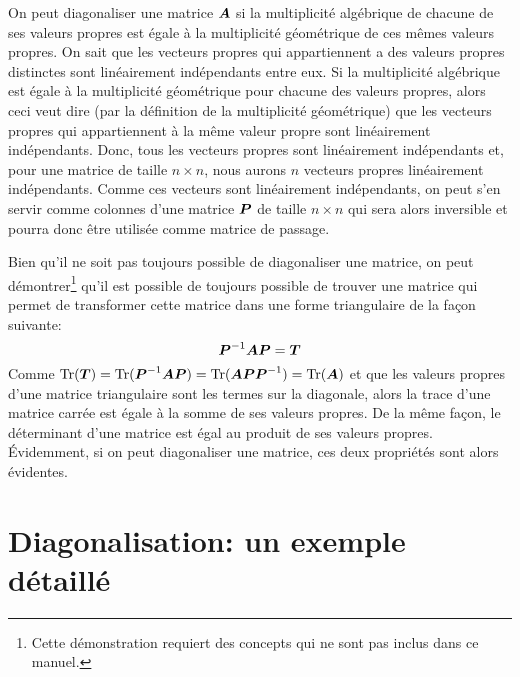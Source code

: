 \begin{theo}
On peut diagonaliser une matrice $\boldsymbol{A}$ si la multiplicité algébrique
de chacune de ses valeurs propres est égale à la multiplicité géométrique de ces mêmes valeurs
propres.
\proof 
On sait que les vecteurs propres qui appartiennent a des valeurs propres distinctes sont
linéairement indépendants entre eux.  Si la multiplicité algébrique 
est égale à la multiplicité géométrique pour chacune des valeurs propres, alors ceci veut
dire (par la définition de la multiplicité géométrique) que les vecteurs propres qui
 appartiennent à la même valeur propre sont linéairement indépendants.  Donc, tous les
 vecteurs propres sont linéairement indépendants et, pour une matrice de taille $n\times n$,
 nous aurons $n$ vecteurs propres linéairement indépendants.
 Comme ces vecteurs
sont linéairement indépendants, on peut s'en servir comme colonnes d'une matrice
$\boldsymbol{P}$ de taille $n\times n$ qui sera alors inversible et pourra donc être utilisée
comme matrice de passage.
\end{theo}

Bien qu'il ne soit pas toujours possible de diagonaliser une matrice, 
on peut démontrer\footnote{Cette démonstration requiert des concepts qui ne sont
pas inclus dans ce manuel.}
qu'il est possible de toujours possible de trouver une matrice qui permet de transformer
cette matrice dans une forme triangulaire de la façon suivante:
\[
\boldsymbol{P}^{-1}\boldsymbol{A}\boldsymbol{P} = \boldsymbol{T}
\]
Comme $\operatorname{Tr}(\boldsymbol{T})=\operatorname{Tr}(\boldsymbol{P}^{-1}\boldsymbol{A}\boldsymbol{P}) = \operatorname{Tr}(\boldsymbol{A}\boldsymbol{P}\boldsymbol{P}^{-1}) = \operatorname{Tr}(\boldsymbol{A})$
et que les valeurs propres d'une matrice triangulaire sont les termes sur la diagonale, alors
la trace d'une matrice carrée est égale à la somme de ses valeurs propres.  De la même
façon, le déterminant d'une matrice est égal au produit de ses valeurs propres.
Évidemment, si on peut diagonaliser une matrice, ces deux propriétés sont alors évidentes.

\section{Diagonalisation: un exemple détaillé}

